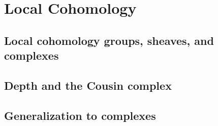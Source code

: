 
\chapter{Local Cohomology}
\section{Local cohomology groups, sheaves, and complexes}
\section{Depth and the Cousin complex}
\section{Generalization to complexes}
